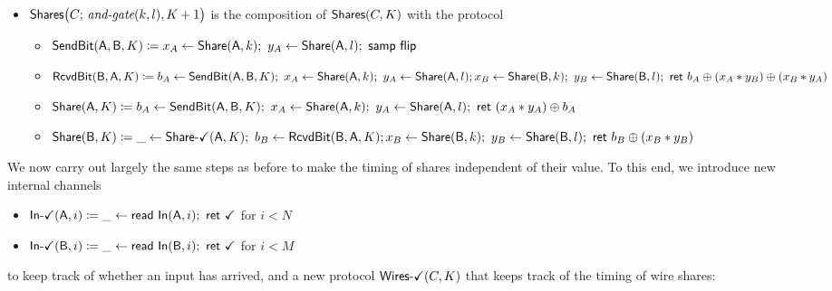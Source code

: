 \begin{itemize}
\item $\mathsf{Shares}\big(C; \, \textit{and-gate}(k,l),K+1\big)$ is the composition of $\mathsf{Shares}(C,K)$ with the protocol
\begin{itemize}
\item $\SendBit(\A,\B,K) \coloneqq x_A \leftarrow \Share(\A,k); \ y_A \leftarrow \Share(\A,l); \ \samp{\flip}$
\item $\mathsf{RcvdBit}(\mathsf{B},\mathsf{A},K) \coloneqq b_A \leftarrow \mathsf{SendBit}(\mathsf{A},\mathsf{B},K); \ x_A \leftarrow \mathsf{Share}(\mathsf{A},k); \ y_A \leftarrow \mathsf{Share}(\mathsf{A},l); \\ x_B \leftarrow \mathsf{Share}(\mathsf{B},k); \ y_B \leftarrow \mathsf{Share}(\mathsf{B},l); \ \mathsf{ret} \ b_A \oplus (x_A * y_B) \oplus (x_B * y_A)$
\item $\mathsf{Share}(\mathsf{A},K) \coloneqq b_A \leftarrow \mathsf{SendBit}(\mathsf{A},\mathsf{B},K); \ x_A \leftarrow \mathsf{Share}(\mathsf{A},k); \ y_A \leftarrow \mathsf{Share}(\mathsf{A},l); \ \mathsf{ret} \ (x_A * y_A) \oplus b_A$
\item $\mathsf{Share}(\mathsf{B},K) \coloneqq \_ \leftarrow \mathsf{Share}\textsf{-}\checkmark(\mathsf{A},K); \ b_B \leftarrow \mathsf{RcvdBit}(\mathsf{B},\mathsf{A},K); \\ x_B \leftarrow \mathsf{Share}(\mathsf{B},k); \ y_B \leftarrow \mathsf{Share}(\mathsf{B},l); \ \mathsf{ret} \ b_B \oplus (x_B * y_B)$
\end{itemize}
\end{itemize}

\noindent We now carry out largely the same steps as before to make the timing of shares independent of their value. To this end, we introduce new internal channels
\begin{itemize}
\item {\color{teal} $\mathsf{In}\textsf{-}\checkmark(\mathsf{A},i) \coloneqq \_ \leftarrow \mathsf{read} \ \mathsf{In}(\mathsf{A},i); \ \mathsf{ret} \ \checkmark$ for $i < N$}
\item {\color{teal} $\mathsf{In}\textsf{-}\checkmark(\mathsf{B},i) \coloneqq \_ \leftarrow \mathsf{read} \ \mathsf{In}(\mathsf{B},i); \ \mathsf{ret} \ \checkmark$ for $i < M$}
\end{itemize}
to keep track of whether an input has arrived, and a new protocol $\mathsf{Wires}\textsf{-}\checkmark(C,K)$ that keeps track of the timing of wire shares:

